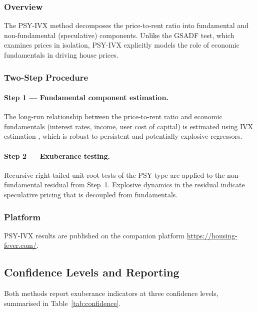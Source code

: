 \subsubsection{Overview}

The PSY-IVX method \citep{shi2021} decomposes the price-to-rent ratio into
fundamental and non-fundamental (speculative) components. Unlike the GSADF
test, which examines prices in isolation, PSY-IVX explicitly models the role
of economic fundamentals in driving house prices.

\subsubsection{Two-Step Procedure}

\paragraph{Step 1 --- Fundamental component estimation.}
The long-run relationship between the price-to-rent ratio and economic
fundamentals (interest rates, income, user cost of capital) is estimated
using IVX estimation \citep{shi2021}, which is robust to persistent and
potentially explosive regressors.

\paragraph{Step 2 --- Exuberance testing.}
Recursive right-tailed unit root tests of the PSY type are applied to the
non-fundamental residual from Step~1. Explosive dynamics in the residual
indicate speculative pricing that is decoupled from fundamentals.

\subsubsection{Platform}

PSY-IVX results are published on the companion platform
\url{https://housing-fever.com/}.

\subsection{Confidence Levels and Reporting}
\label{subsec:reporting}

Both methods report exuberance indicators at three confidence levels,
summarised in Table~\ref{tab:confidence}.

